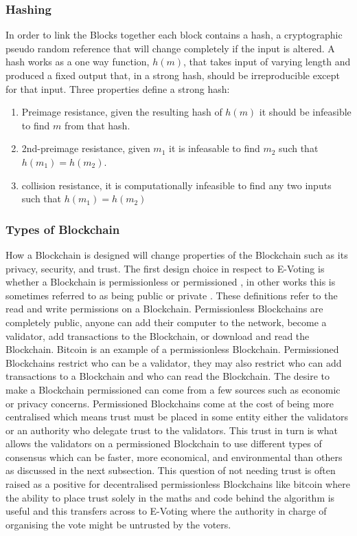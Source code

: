 \documentclass{entcs}
\begin{document}
\subsubsection{Hashing}
In order to link the Blocks together each block contains a hash, a cryptographic pseudo random reference that will change completely if the input is altered. A hash works as a one way function, \(h(m)\), that takes input of varying length and produced a fixed output that, in a strong hash, should be irreproducible except for that input. Three properties \cite{cryptoHandbook} define a strong hash:
\begin{enumerate}
    \item Preimage resistance, given the resulting hash of \(h(m)\) it should be infeasible to find \(m\) from that hash. 
    \item 2nd-preimage resistance, given \(m_1\) it is infeasable to find \(m_2\) such that \(h(m_1) = h(m_2)\).
    \item collision resistance, it is computationally infeasible to find any two inputs such that \(h(m_1) = h(m_2)\)
\end{enumerate}

\subsubsection{Types of Blockchain}
How a Blockchain is designed will change properties of the Blockchain such as its privacy, security, and trust. The first design choice in respect to E-Voting is whether a Blockchain is permissionless or permissioned \cite{wust2018need}, in other works this is sometimes referred to as being public or private \cite{blockchainBeginners}. These definitions refer to the read and write permissions on a Blockchain. 
Permissionless Blockchains are completely public, anyone can add their computer to the network, become a validator, add transactions to the Blockchain, or download and read the Blockchain. Bitcoin is an example of a permissionless Blockchain.
Permissioned Blockchains restrict who can be a validator, they may also restrict who can add transactions to a Blockchain and who can read the Blockchain. The desire to make a Blockchain permissioned can come from a few sources such as economic or privacy concerns. Permissioned Blockchains come at the cost of being more centralised which means trust must be placed in some entity either the validators or an authority who delegate trust to the validators. This trust in turn is what allows the validators on a permissioned Blockchain to use different types of consensus which can be faster, more economical, and environmental than others as discussed in the next subsection.
This question of not needing trust \cite{lemieux2016trusting} is often raised as a positive for decentralised permissionless Blockchains like bitcoin where the ability to place trust solely in the maths and code behind the algorithm is useful and this transfers across to E-Voting where the authority in charge of organising the vote might be untrusted by the voters.
\end{document}
